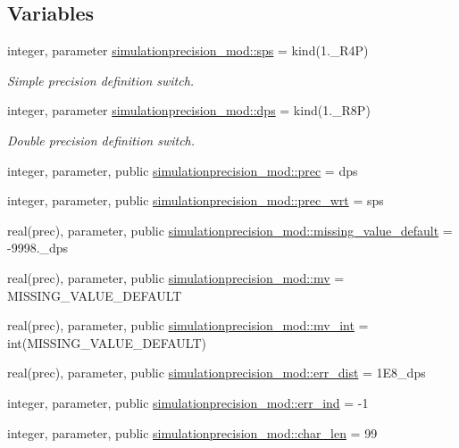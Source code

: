 \subsection*{Variables}
\begin{DoxyCompactItemize}
\item 
integer, parameter \mbox{\hyperlink{namespacesimulationprecision__mod_a4e5f74805628e67a1d7b33106780b85d}{simulationprecision\+\_\+mod\+::sps}} = kind(1.\+\_\+\+R4P)
\begin{DoxyCompactList}\small\item\em Simple precision definition switch. \end{DoxyCompactList}\item 
integer, parameter \mbox{\hyperlink{namespacesimulationprecision__mod_a1993497bc3b1b9925d3e409fe8891e8c}{simulationprecision\+\_\+mod\+::dps}} = kind(1.\+\_\+\+R8P)
\begin{DoxyCompactList}\small\item\em Double precision definition switch. \end{DoxyCompactList}\item 
integer, parameter, public \mbox{\hyperlink{namespacesimulationprecision__mod_a361ca48174e0dc2228c07f25fa5396ec}{simulationprecision\+\_\+mod\+::prec}} = dps
\item 
integer, parameter, public \mbox{\hyperlink{namespacesimulationprecision__mod_a2afc058035b6678d4ba773117f7c5202}{simulationprecision\+\_\+mod\+::prec\+\_\+wrt}} = sps
\item 
real(prec), parameter, public \mbox{\hyperlink{namespacesimulationprecision__mod_a8fe62365170cdfed5a745be6d8e99e1c}{simulationprecision\+\_\+mod\+::missing\+\_\+value\+\_\+default}} = -\/9998.\+\_\+dps
\item 
real(prec), parameter, public \mbox{\hyperlink{namespacesimulationprecision__mod_aee970e36f3dc8fb77c175ead993257d9}{simulationprecision\+\_\+mod\+::mv}} = M\+I\+S\+S\+I\+N\+G\+\_\+\+V\+A\+L\+U\+E\+\_\+\+D\+E\+F\+A\+U\+LT
\item 
real(prec), parameter, public \mbox{\hyperlink{namespacesimulationprecision__mod_a8d1d7d124b73efb89060c2d696b87bea}{simulationprecision\+\_\+mod\+::mv\+\_\+int}} = int(M\+I\+S\+S\+I\+N\+G\+\_\+\+V\+A\+L\+U\+E\+\_\+\+D\+E\+F\+A\+U\+LT)
\item 
real(prec), parameter, public \mbox{\hyperlink{namespacesimulationprecision__mod_adb76b934d7acaf56b275c5cc1ecccc4c}{simulationprecision\+\_\+mod\+::err\+\_\+dist}} = 1\+E8\+\_\+dps
\item 
integer, parameter, public \mbox{\hyperlink{namespacesimulationprecision__mod_a7931657e14fb825c4e20dc77ee8f7278}{simulationprecision\+\_\+mod\+::err\+\_\+ind}} = -\/1
\item 
integer, parameter, public \mbox{\hyperlink{namespacesimulationprecision__mod_aba0af56595baca30b62618cc8c05883c}{simulationprecision\+\_\+mod\+::char\+\_\+len}} = 99
\end{DoxyCompactItemize}
